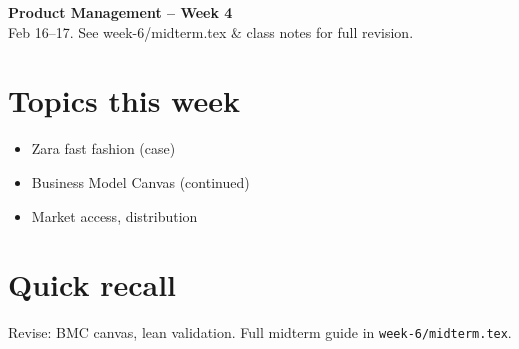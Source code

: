 \documentclass[10pt,a4paper]{article}
\begin{document}
\begin{center}
{\large\bfseries\color{eublue} Product Management -- Week 4}\\[0.2em]
\footnotesize Feb 16--17. See week-6/midterm.tex \& class notes for full revision.
\end{center}\vspace{0.5em}

\section*{\color{eublue}Topics this week}
\begin{itemize}
\item Zara fast fashion (case)
\item Business Model Canvas (continued)
\item Market access, distribution
\end{itemize}

\section*{Quick recall}
Revise: BMC canvas, lean validation. Full midterm guide in \texttt{week-6/midterm.tex}.
\end{document}
